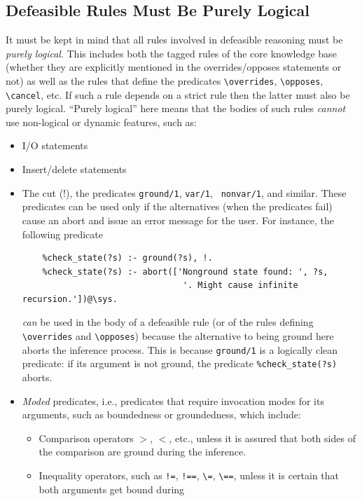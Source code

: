 \documentclass[11pt]{article}
\newcommand{\bs}{\textbackslash}
\begin{document}
\subsection{Defeasible Rules Must Be Purely Logical}
\label{sec-defeasible-logical}

It must be kept in mind that all rules involved in defeasible reasoning
must be \emph{purely logical}.
This includes both the tagged rules of the
core knowledge base (whether they are explicitly mentioned in the
overrides/opposes statements or not) as well as the rules that define the
predicates {\tt \bs{}overrides}, {\tt \bs{}opposes}, \texttt{\bs{}cancel},
etc.
If such a rule depends on a strict
rule then the latter must also be purely logical.
``Purely logical'' here means that the
bodies of such rules \emph{cannot} use non-logical or dynamic features,
such as:
\begin{itemize}
\item  I/O statements
\item  Insert/delete statements
\item  The cut (!), the predicates {\tt ground/1}, {\tt var/1}, {\tt
    nonvar/1}, and similar.
  These predicates can be used only if the alternatives (when
  the predicates fail) cause an abort and issue an error message for the user.
  For instance, the following predicate
\begin{verbatim}
    %check_state(?s) :- ground(?s), !.
    %check_state(?s) :- abort(['Nonground state found: ', ?s,
                                '. Might cause infinite recursion.'])@\sys.  
\end{verbatim}
  \emph{can} be used in the body of a defeasible rule (or of the rules defining
  {\tt \bs{}overrides} and {\tt \bs{}opposes}) because the alternative to being
  ground here aborts the inference process.
  This is because \texttt{ground/1} is a logically clean predicate: if its
  argument is not ground, the predicate \texttt{\%check\_state(?s)} aborts.  
\item \emph{Moded} predicates, i.e.,
  predicates that require invocation modes for its arguments, such as
  boundedness or groundedness, which include:
  \begin{itemize}
  \item  Comparison operators $>$, $<$, etc.,
    unless it is assured that both sides of the
    comparison are ground during the inference.
  \item  Inequality operators, such as {\tt !=}, {\tt !==}, \verb|\=|,
    \verb|\==|,  unless it is certain that both arguments get bound during

\end{itemize}
\end{itemize}
\end{document}
